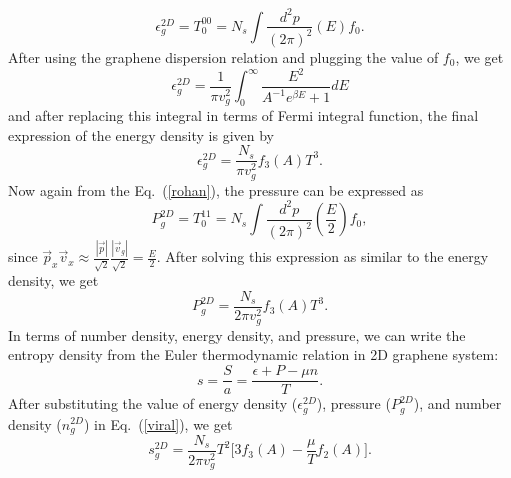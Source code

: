 \documentclass[%
 reprint,
 amsmath,amssymb,
 aps,
]{revtex4-2}
\begin{document}
    \begin{equation}
    \epsilon_g^{2D} = T_0^{0 0} =  N_s \int \frac{d^2 p}{\left(2\pi\right)^2}\left(E \right) f_0.
    \end{equation}
%
    After using the graphene dispersion relation and plugging the value of $f_0$, we get
    \begin{equation}
    \epsilon_g^{2D} = \frac{1}{\pi v_g^2} \int_{0}^{\infty}  \frac{E^2}{A^{-1}e^{\beta E} + 1} dE
    \end{equation}
    and after replacing this integral in terms of Fermi integral function, the final expression of the energy density is given by
    \begin{equation}
    \epsilon_g^{2D} = \frac{N_s}{\pi v_g^2} f_3\left(A\right) T^3.
    \end{equation}
    Now again from the Eq.~(\ref{rohan}), the pressure can be expressed as 
    \begin{equation}
    P_g^{2D} = T_0^{11} = N_s \int \frac{d^2 p}{\left(2\pi\right)^2}\left(\frac{E}{2} \right) f_0,
    \end{equation}
    since $\vec{p}_x \vec{v}_x \approx \frac{|\vec{p}|}{\sqrt{2}} \frac{|\vec{v}_g|}{\sqrt{2}}=\frac{E}{2}$.
    After solving this expression as similar to the energy density, we get
    \begin{equation}
    P_g^{2D} = \frac{N_s}{2 \pi v_g^2} f_3\left(A\right) T^3.
    \end{equation}
%
    In terms of number density, energy density, and pressure, we can write the entropy density from the Euler thermodynamic relation in 2D graphene system:
    \begin{equation}
    s = \frac{S}{a} = \frac{\epsilon + P - \mu n}{T}.
    \label{viral}
    \end{equation}
%
    After substituting the value of energy density ($\epsilon_g^{2D}$), pressure ($P_g^{2D}$), and number density ($ n_g^{2D}$) in Eq.~(\ref{viral}), we get
    \begin{equation}
    s_g^{2D} = \frac{N_s}{2 \pi v_g^2} T^2 \Big[3f_3\left(A\right) - \frac{\mu}{T} f_2\left(A\right) \Big].
    \label{pure}
    \end{equation}
%
%
\end{document}
